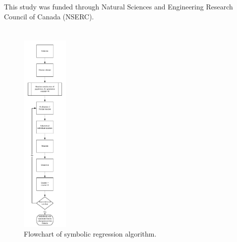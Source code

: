 \documentclass[final,5p,times,twocolumn]{elsarticle}
\begin{document}
This study was funded through Natural Sciences and Engineering Research Council of Canada (NSERC). 



%

%
% 
% 
% 
% 
% 
% 
% 
% 
% 
% 



\cleardoublepage

\appendix 

\section{}
\begin{figure}
	\centering
	\includegraphics[width=0.2\textwidth]{C.png}
	\caption{Flowchart of symbolic regression algorithm.}
	\label{fig:AF}
\end{figure}
\end{document}
